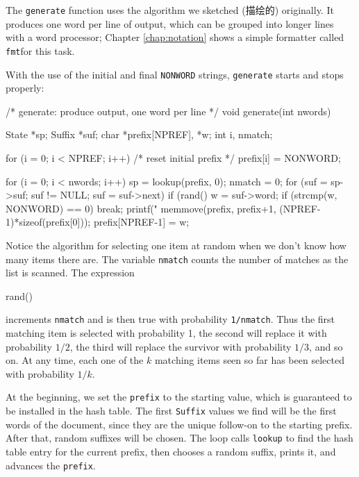 The \verb'generate' function uses the algorithm we sketched (描绘的)
originally. It produces one word per line of output, which can be grouped
into longer lines with a word processor; Chapter \ref{chap:notation} shows
a simple formatter called \verb'fmt'for this task.

With the use of the initial and final \verb'NONWORD' strings,
\verb'generate' starts and stops properly:
\begin{wellcode}
    /* generate: produce output, one word per line */
    void generate(int nwords)
    {
        State   *sp;
        Suffix  *suf;
        char    *prefix[NPREF], *w;
        int     i, nmatch;

        for (i = 0; i < NPREF; i++) /* reset initial prefix */
            prefix[i] = NONWORD;

        for (i = 0; i < nwords; i++) {
            sp = lookup(prefix, 0);
            nmatch = 0;
            for (suf = sp->suf; suf != NULL; suf = suf->next)
                if (rand() %
                    w = suf->word;
            if (strcmp(w, NONWORD) == 0)
                break;
            printf("%
            memmove(prefix, prefix+1, (NPREF-1)*sizeof(prefix[0]));
            prefix[NPREF-1] = w;
        }
    }
\end{wellcode}

Notice the algorithm for selecting one item at random when we don't know
how many items there are. The variable \verb'nmatch' counts the number of
matches as the list is scanned. The expression
\begin{wellcode}
    rand() %
\end{wellcode}
increments \verb'nmatch' and is then true with probability \verb'1/nmatch'.
Thus the first matching item is selected with probability 1, the second
will replace it with probability $1/2$, the third will replace the survivor
with probability $1/3$, and so on. At any time, each one of the $k$
matching items seen so far has been selected with probability $1/k$.

At the beginning, we set the \verb'prefix' to the starting value, which is
guaranteed to be installed in the hash table. The first \verb'Suffix'
values we find will be the first words of the document, since they are the
unique follow-on to the starting prefix. After that, random suffixes will
be chosen. The loop calls \verb'lookup' to find the hash table entry for
the current prefix, then chooses a random suffix, prints it, and advances
the \verb'prefix'.

